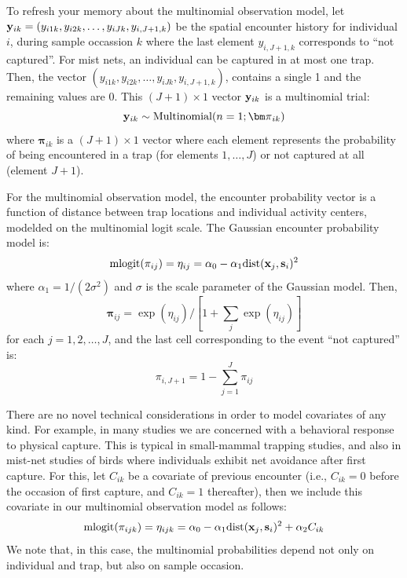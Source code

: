 To refresh your memory about the multinomial observation model, let
${\bf y}_{ik} = (y_{i1k}, y_{i2k}, \ldots, y_{iJk}, y_{i,J+1,k})$ be the
spatial encounter history for individual $i$, during sample occassion
$k$ where the last element $y_{i,J+1,k}$ corresponds to ``not
captured''.  For mist nets, an individual can be captured in at most
one trap. Then, the vector
$(y_{i1k},y_{i2k},\ldots,y_{iJk},y_{i,J+1,k})$, contains a single 1
and the remaining values are 0.  This $(J+1)\times 1$ vector ${\bf
  y}_{ik}$ is a multinomial trial:
\[
{\bf y}_{ik} \sim \mbox{Multinomial}(n=1; {\bm \pi}_{ik} )
\]
where ${\bm \pi}_{ik}$ is a $(J+1) \times 1$ vector where each element
represents the probability of being encountered in a trap (for
elements $1,\ldots,J$) or not captured at all (element $J+1$).

For the multinomial observation model, the encounter probability
vector is a function of distance between trap locations and individual
activity centers, modelded on the multinomial logit scale. The
Gaussian encounter probability model is:
\begin{equation}
\mbox{mlogit}(\pi_{ij}) = \eta_{ij}  =  \alpha_0 - \alpha_{1} \mbox{dist}({\bf x}_{j},{\bf s}_{i})^2
\label{hscr.eq.mlogit}
\end{equation}
where $\alpha_{1} = 1/(2\sigma^2)$ and $\sigma$ is the scale
parameter of the Gaussian model. Then,
\[
{\bm \pi}_{ij} = \exp(\eta_{ij})/[ 1 + \sum_{j} \exp(\eta_{ij}) ]
\]
for each $j=1,2,\ldots,J$, and the last cell corresponding to the
event ``not captured'' is:
\[
\pi_{i,J+1} = 1- \sum_{j=1}^{J} \pi_{ij}
\]

There are no novel technical considerations in order to model
covariates of any kind.  For example, in many studies we are concerned
with a behavioral response to physical capture. This is typical in
small-mammal trapping studies, and also in mist-net studies of birds
where individuals exhibit net avoidance after first capture. For this,
let $C_{ik}$ be a covariate of previous encounter (i.e., $C_{ik} = 0$
before the occasion of first capture, and $C_{ik} = 1$ thereafter),
then we include this covariate in our multinomial observation model as
follows:
\[
\mbox{mlogit}(\pi_{ijk}) = \eta_{ijk} = \alpha_{0}  - \alpha_{1}
\mbox{dist}({\bf  x}_{j},{\bf s}_{i})^2 +  \alpha_{2} C_{ik}
\]
We note that, in this case, the multinomial probabilities depend not only
on individual and trap, but also on sample occasion.

